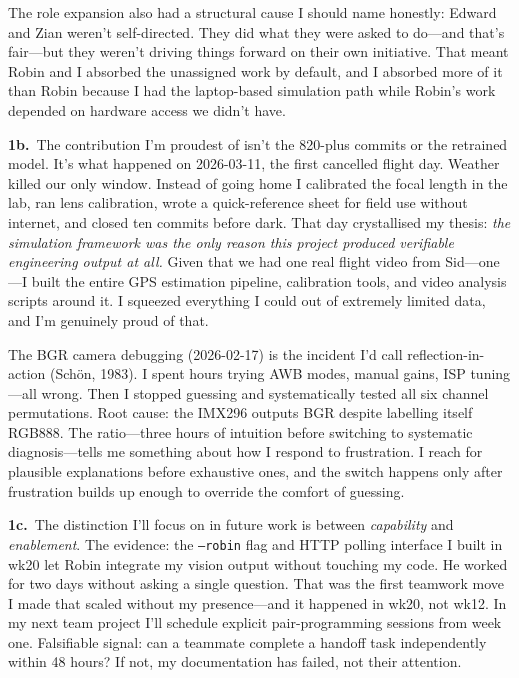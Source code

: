 The role expansion also had a structural cause I should name honestly: Edward and Zian weren't self-directed. They did what they were asked to do---and that's fair---but they weren't driving things forward on their own initiative. That meant Robin and I absorbed the unassigned work by default, and I absorbed more of it than Robin because I had the laptop-based simulation path while Robin's work depended on hardware access we didn't have.

\textbf{1b.}~The contribution I'm proudest of isn't the 820-plus commits or the retrained model. It's what happened on 2026-03-11, the first cancelled flight day. Weather killed our only window. Instead of going home I calibrated the focal length in the lab, ran lens calibration, wrote a quick-reference sheet for field use without internet, and closed ten commits before dark. That day crystallised my thesis: \emph{the simulation framework was the only reason this project produced verifiable engineering output at all.} Given that we had one real flight video from Sid---one---I built the entire GPS estimation pipeline, calibration tools, and video analysis scripts around it. I squeezed everything I could out of extremely limited data, and I'm genuinely proud of that.

The BGR camera debugging (2026-02-17) is the incident I'd call reflection-in-action (Sch\"on, 1983). I spent hours trying AWB modes, manual gains, ISP tuning---all wrong. Then I stopped guessing and systematically tested all six channel permutations. Root cause: the IMX296 outputs BGR despite labelling itself RGB888. The ratio---three hours of intuition before switching to systematic diagnosis---tells me something about how I respond to frustration. I reach for plausible explanations before exhaustive ones, and the switch happens only after frustration builds up enough to override the comfort of guessing.

\textbf{1c.}~The distinction I'll focus on in future work is between \emph{capability} and \emph{enablement}. The evidence: the \texttt{--robin} flag and HTTP polling interface I built in wk20 let Robin integrate my vision output without touching my code. He worked for two days without asking a single question. That was the first teamwork move I made that scaled without my presence---and it happened in wk20, not wk12. In my next team project I'll schedule explicit pair-programming sessions from week one. Falsifiable signal: can a teammate complete a handoff task independently within 48 hours? If not, my documentation has failed, not their attention.

